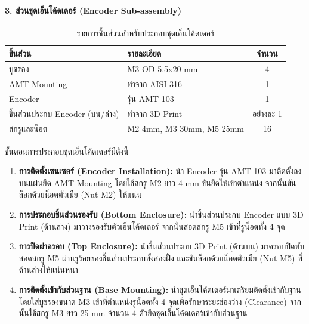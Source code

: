 \paragraph{3. ส่วนชุดเอ็นโค้ดเดอร์ (Encoder Sub-assembly)}
\label{sec:encoder_assembly}

\begin{table}[H]
\centering
\caption{รายการชิ้นส่วนสำหรับประกอบชุดเอ็นโค้ดเดอร์}
\label{tab:encoder_parts}
\begin{tabular}{llc}
\toprule
ชิ้นส่วน & รายละเอียด & จำนวน \\
\midrule
บูชรอง & M3 OD 5.5x20 mm & 4 \\
AMT Mounting & ทำจาก AISI 316 & 1 \\
Encoder & รุ่น AMT-103 & 1 \\
ชิ้นส่วนประกบ Encoder (บน/ล่าง) & ทำจาก 3D Print & อย่างละ 1 \\
สกรูและน็อต & M2 4mm, M3 30mm, M5 25mm & 16 \\
\bottomrule
\end{tabular}
\end{table}

ขั้นตอนการประกอบชุดเอ็นโค้ดเดอร์มีดังนี้
\begin{enumerate}
    \item \textbf{การติดตั้งเซนเซอร์ (Encoder Installation):} นำ Encoder รุ่น AMT-103 มาติดตั้งลงบนแผ่นยึด AMT Mounting โดยใช้สกรู M2 ยาว 4 mm ขันยึดให้เข้าตำแหน่ง จากนั้นขันล็อกด้วยน็อตตัวเมีย (Nut M2) ให้แน่น
    \item \textbf{การประกอบชิ้นส่วนรองรับ (Bottom Enclosure):} นำชิ้นส่วนประกบ Encoder แบบ 3D Print (ด้านล่าง) มาวางรองรับตัวเอ็นโค้ดเดอร์ จากนั้นสอดสกรู M5 เข้าที่รูน็อตทั้ง 4 จุด
    \item \textbf{การปิดฝาครอบ (Top Enclosure):} นำชิ้นส่วนประกบ 3D Print (ด้านบน) มาครอบปิดทับ สอดสกรู M5 ผ่านรูร้อยของชิ้นส่วนประกบทั้งสองฝั่ง และขันล็อกด้วยน็อตตัวเมีย (Nut M5) ที่ด้านล่างให้แน่นหนา
    \item \textbf{การติดตั้งเข้ากับส่วนฐาน (Base Mounting):} นำชุดเอ็นโค้ดเดอร์มาเตรียมติดตั้งเข้ากับฐาน โดยใส่บูชรองขนาด M3 เข้าที่ตำแหน่งรูน็อตทั้ง 4 จุดเพื่อรักษาระยะช่องว่าง (Clearance) จากนั้นใช้สกรู M3 ยาว 25 mm จำนวน 4 ตัวยึดชุดเอ็นโค้ดเดอร์เข้ากับส่วนฐาน
\end{enumerate}

